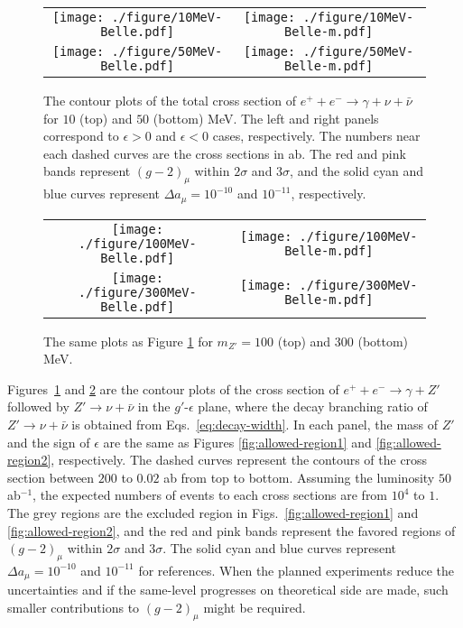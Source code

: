 \documentclass[preprint,amsmath,amssymb,superscriptaddress,nofootinbib]{revtex4}
\begin{document}
\begin{figure}[t]
\begin{center}
\begin{tabular}{cc}
\texttt{[image: ./figure/10MeV-Belle.pdf]}
&
\texttt{[image: ./figure/10MeV-Belle-m.pdf]} \\
%
\texttt{[image: ./figure/50MeV-Belle.pdf]}
&
\texttt{[image: ./figure/50MeV-Belle-m.pdf]} 
%
\end{tabular}
\end{center}
\caption{The contour plots of the total cross section of $e^+ + e^- \rightarrow \gamma + \nu + \bar{\nu}$ for 
$10$ (top) and $50$ (bottom) MeV. The left and right panels correspond to $\epsilon > 0$ and $\epsilon < 0$ 
cases, respectively. The numbers near each dashed curves are the cross sections in ab. 
The red and pink bands represent $(g-2)_\mu$ within $2\sigma$ and $3\sigma$, and the solid cyan and blue 
curves represent $\Delta a_\mu = 10^{-10}$ and $10^{-11}$, respectively.
}
\label{fig:belle-g-2-1}
\end{figure}


\begin{figure}[t]
\begin{center}
\begin{tabular}{cc}
\texttt{[image: ./figure/100MeV-Belle.pdf]}
&
\texttt{[image: ./figure/100MeV-Belle-m.pdf]} \\
%
\texttt{[image: ./figure/300MeV-Belle.pdf]}
&
\texttt{[image: ./figure/300MeV-Belle-m.pdf]} \\
%
\end{tabular}
\end{center}
\caption{ 
The same plots as Figure \ref{fig:belle-g-2-1} for $m_{Z'} = 100$ (top) and $300$ (bottom) MeV.}
\label{fig:belle-g-2-2}
\end{figure}



Figures~\ref{fig:belle-g-2-1} and \ref{fig:belle-g-2-2} are the contour plots of the cross section of $e^+ + e^- \rightarrow \gamma + Z'$ 
followed by $Z' \rightarrow \nu + \bar{\nu}$ in the $g'$-$\epsilon$ plane, where the decay branching 
ratio of $Z' \rightarrow \nu + \bar{\nu}$ is obtained from Eqs.~\eqref{eq:decay-width}. 
In each panel, the mass of $Z'$ and the sign of $\epsilon$ are the same 
as Figures \ref{fig:allowed-region1} and \ref{fig:allowed-region2}, respectively. 
The dashed curves represent the contours of the cross section between $200$ to $0.02$ ab from top to bottom. 
Assuming the luminosity $50$ ab$^{-1}$, the expected numbers of events to each cross sections are 
from $10^4$ to $1$.
The grey regions are the excluded region in Figs.~\ref{fig:allowed-region1} and \ref{fig:allowed-region2}, and 
the red and pink bands represent the favored regions of $(g-2)_\mu$ within $2\sigma$ and $3\sigma$. 
The solid cyan and blue curves represent $\Delta a_\mu = 10^{-10}$ and $10^{-11}$ for references. 
When the planned experiments reduce the uncertainties and if the same-level progresses on theoretical side are made, 
such smaller contributions to $(g-2)_\mu$ might be required. 
\end{document}

